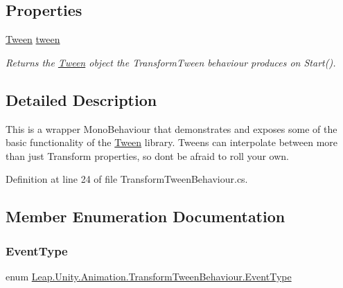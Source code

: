 \subsection*{Properties}
\begin{DoxyCompactItemize}
\item 
\mbox{\hyperlink{struct_leap_1_1_unity_1_1_animation_1_1_tween}{Tween}} \mbox{\hyperlink{class_leap_1_1_unity_1_1_animation_1_1_transform_tween_behaviour_ad285758e0b274c88f5371930ff965dc8}{tween}}
\begin{DoxyCompactList}\small\item\em Returns the \mbox{\hyperlink{struct_leap_1_1_unity_1_1_animation_1_1_tween}{Tween}} object the Transform\+Tween behaviour produces on Start(). \end{DoxyCompactList}\end{DoxyCompactItemize}


\subsection{Detailed Description}
This is a wrapper Mono\+Behaviour that demonstrates and exposes some of the basic functionality of the \mbox{\hyperlink{struct_leap_1_1_unity_1_1_animation_1_1_tween}{Tween}} library. Tweens can interpolate between more than just Transform properties, so don\textquotesingle{}t be afraid to roll your own. 



Definition at line 24 of file Transform\+Tween\+Behaviour.\+cs.



\subsection{Member Enumeration Documentation}
\mbox{\label{class_leap_1_1_unity_1_1_animation_1_1_transform_tween_behaviour_a67bb4276381fa709e2235bed246678c1}} 
\subsubsection{\texorpdfstring{EventType}{EventType}}
{\footnotesize\ttfamily enum \mbox{\hyperlink{class_leap_1_1_unity_1_1_animation_1_1_transform_tween_behaviour_a67bb4276381fa709e2235bed246678c1}{Leap.\+Unity.\+Animation.\+Transform\+Tween\+Behaviour.\+Event\+Type}}\hspace{0.3cm}{\ttfamily [strong]}}

